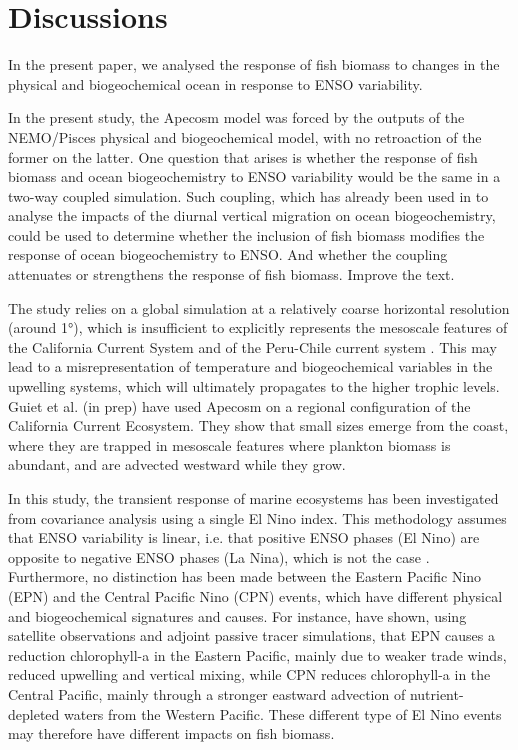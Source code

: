 \section{Discussions}

In the present paper, we analysed the response of fish biomass to changes in the physical and biogeochemical ocean in response to ENSO variability. 

In the present study, the Apecosm model was forced by the outputs of the NEMO/Pisces physical and biogeochemical model, with no retroaction of the former on the latter. One question that arises is whether the response of fish biomass and ocean biogeochemistry to ENSO variability would be the same in a two-way coupled simulation. 	Such coupling, which has already been used in \cite{aumontEvaluatingPotentialImpacts2018,} to analyse the impacts of the diurnal vertical migration on ocean biogeochemistry, could be used to determine whether the inclusion of fish biomass modifies the response of ocean biogeochemistry to ENSO. And whether the coupling attenuates or strengthens the response of fish biomass. Improve the text.
 
The study relies on a global simulation at a relatively coarse horizontal resolution (around 1°), which is insufficient to explicitly represents the mesoscale features of the California Current System \citep{capetMesoscaleSubmesoscaleTransition2008} and of the Peru-Chile current system \citep{colasHeatBalanceEddies2012}. This may lead to a misrepresentation of temperature and biogeochemical variables in the upwelling systems, which will ultimately propagates to the higher trophic levels. Guiet et al. (in prep) have used Apecosm on a regional configuration of the California Current Ecosystem. They show that small sizes emerge from the coast, where they are trapped in mesoscale features where plankton biomass is abundant, and are advected westward while they grow.

In this study, the transient response of marine ecosystems has been investigated from covariance analysis using a single El Nino index. This methodology assumes that ENSO variability is linear, i.e. that positive ENSO phases (El Nino) are opposite to negative ENSO phases (La Nina), which is not the case \citep{larkinENSOWarmNino2002}. Furthermore, no distinction has been made between the Eastern Pacific Nino (EPN) and the Central Pacific Nino (CPN) events, which have different physical and biogeochemical signatures and causes. For instance, \cite{gierachBiologicalResponse19972012} have shown, using satellite observations and adjoint passive tracer simulations, that EPN causes a reduction chlorophyll-a in the Eastern Pacific, mainly due to weaker trade winds, reduced upwelling and vertical mixing, while CPN reduces chlorophyll-a in the Central Pacific, mainly through a stronger eastward advection of nutrient-depleted waters from the Western Pacific. These different type of El Nino events may therefore have different impacts on fish biomass.

